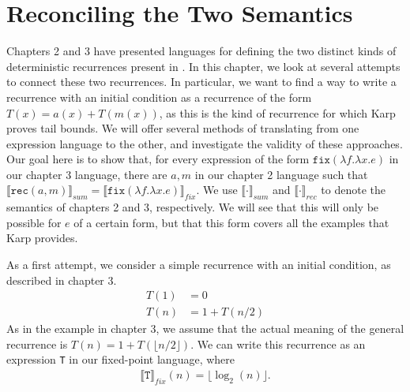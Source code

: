 \chapter{Reconciling the Two Semantics}
Chapters 2 and 3 have presented languages for defining the two distinct kinds of deterministic recurrences present in 
\cite{Karp}. In this chapter, we look at several attempts to connect these two recurrences. In particular, we want to find a 
way to write a recurrence with an initial condition as a recurrence of the form $T(x) = a(x) + T(m(x))$, as this is the kind
of recurrence for which Karp proves tail bounds. We will offer
several methods of translating from one expression language to the other, and investigate the validity of these 
approaches. Our goal here is to show that, for every expression of the form $\texttt{fix}(\lambda f.\lambda x.e)$ in our
 chapter 3 language, there are $a, m$ in our chapter 2 language such that 
 $\llbracket \texttt{rec}(a,m)\rrbracket_{sum} = \llbracket \texttt{fix}(\lambda f.\lambda x.e)\rrbracket_{fix}$. We use
 $\llbracket \cdot\rrbracket_{sum}$ and $\llbracket \cdot\rrbracket_{rec}$ to denote the semantics of chapters 2 and
 3, respectively. We will see that this will only be possible for $e$ of a certain form, but that this form covers all the 
 examples that Karp provides.

As a first attempt, we consider a simple recurrence with an initial condition, as described in chapter 3.
\begin{align*}
T(1) &= 0 \\
T(n) &= 1 + T(n/2) 
\end{align*}
As in the example in chapter 3, we assume that the actual meaning of the general recurrence
is $T(n) = 1 + T(\lfloor n/2 \rfloor)$.
We can write this recurrence as an expression \texttt{T} in our fixed-point language, where
\begin{align*}
\llbracket \texttt{T}\rrbracket_{fix}(n) = \lfloor \log_2(n) \rfloor.
\end{align*} 

